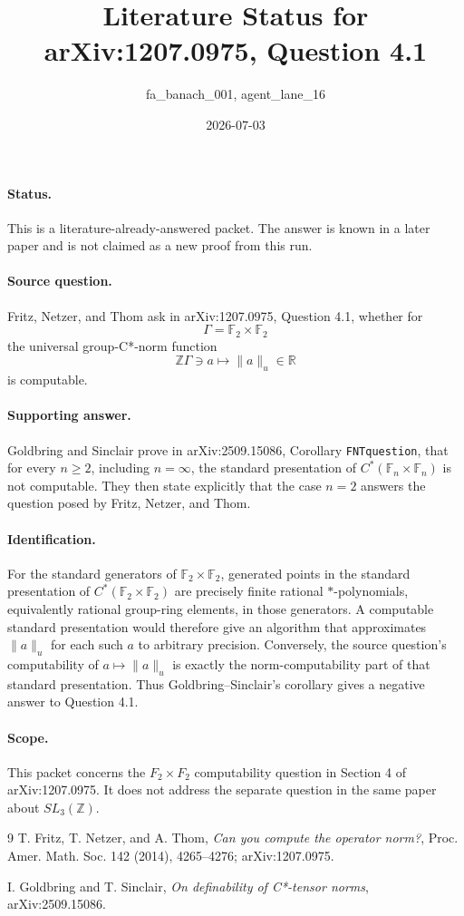 \documentclass[11pt]{article}
\title{Literature Status for arXiv:1207.0975, Question 4.1}
\author{fa\_banach\_001, agent\_lane\_16}
\date{2026-07-03}
\newcommand{\F}{\mathbb F}
\newcommand{\Z}{\mathbb Z}
\newcommand{\R}{\mathbb R}
\begin{document}
\maketitle

\paragraph{Status.}
This is a literature-already-answered packet.  The answer is known in a later
paper and is not claimed as a new proof from this run.

\paragraph{Source question.}
Fritz, Netzer, and Thom ask in arXiv:1207.0975, Question 4.1, whether for
\[
  \Gamma=\F_2\times\F_2
\]
the universal group-C*-norm function
\[
  \Z\Gamma\ni a\longmapsto \|a\|_u\in\R
\]
is computable.

\paragraph{Supporting answer.}
Goldbring and Sinclair prove in arXiv:2509.15086, Corollary
\texttt{FNTquestion}, that for every \(n\geq 2\), including \(n=\infty\), the
standard presentation of \(C^*(\F_n\times \F_n)\) is not computable.  They then
state explicitly that the case \(n=2\) answers the question posed by Fritz,
Netzer, and Thom.

\paragraph{Identification.}
For the standard generators of \(\F_2\times\F_2\), generated points in the
standard presentation of \(C^*(\F_2\times\F_2)\) are precisely finite rational
\(*\)-polynomials, equivalently rational group-ring elements, in those
generators.  A computable standard presentation would therefore give an
algorithm that approximates \(\|a\|_u\) for each such \(a\) to arbitrary
precision.  Conversely, the source question's computability of
\(a\mapsto\|a\|_u\) is exactly the norm-computability part of that standard
presentation.  Thus Goldbring--Sinclair's corollary gives a negative answer to
Question 4.1.

\paragraph{Scope.}
This packet concerns the \(F_2\times F_2\) computability question in Section 4
of arXiv:1207.0975.  It does not address the separate question in the same
paper about \(SL_3(\Z)\).

\begin{thebibliography}{9}
T. Fritz, T. Netzer, and A. Thom,
\emph{Can you compute the operator norm?},
Proc. Amer. Math. Soc. 142 (2014), 4265--4276; arXiv:1207.0975.

I. Goldbring and T. Sinclair,
\emph{On definability of C*-tensor norms},
arXiv:2509.15086.
\end{thebibliography}
\end{document}
